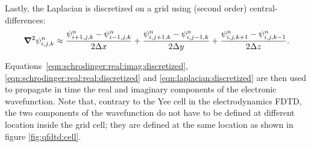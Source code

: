 Lastly, the Laplacian is discretized on a grid using (second order)
central-differences:
\begin{align}
\bm{\nabla}^2 \psi_{i,j,k}^{n} \approx
      \frac{ \psi_{i+1,j,k}^{n} - \psi_{i-1,j,k}^{n} }{2 \Delta x}
    + \frac{ \psi_{i,j+1,k}^{n} - \psi_{i,j-1,k}^{n} }{2 \Delta y}
    + \frac{ \psi_{i,j,k+1}^{n} - \psi_{i,j,k-1}^{n} }{2 \Delta z}.
\label{eqn:laplacian:discretized}
\end{align}

Equations~\eqref{eqn:schrodinger:real:imag:discretized},
\eqref{eqn:schrodinger:real:real:discretized} and
\eqref{eqn:laplacian:discretized} are then used to propagate in time the real
and imaginary components of the electronic wavefunction. Note that, contrary
to the Yee cell in the electrodynamics FDTD, the two components of the
wavefunction do not have to be defined at different location inside the grid
cell; they are defined at the same location as shown in figure
\ref{fig:qfdtd:cell}.

